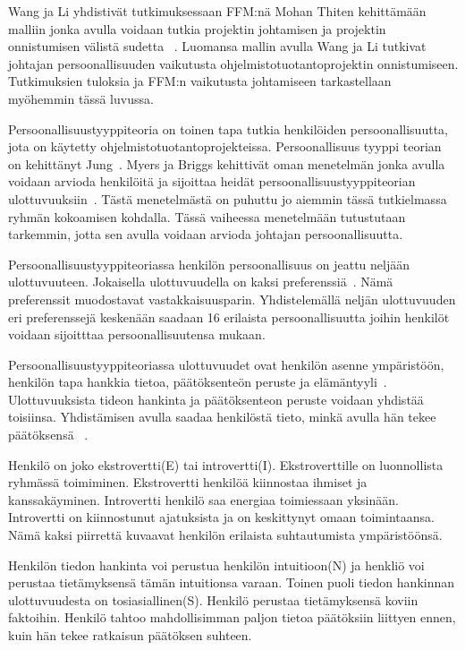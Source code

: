 \documentclass[finnish]{tktltiki2}
\theoremstyle{definition}
\theoremstyle{remark}
\begin{document}
Wang ja Li yhdistivät tutkimuksessaan FFM:nä Mohan Thiten kehittämään malliin jonka avulla voidaan tutkia projektin johtamisen ja projektin onnistumisen välistä sudetta ~\cite{Wang:2009:PMP:1639950.1640049}. Luomansa mallin avulla Wang ja Li tutkivat johtajan persoonallisuuden vaikutusta ohjelmistotuotantoprojektin onnistumiseen. Tutkimuksien tuloksia ja FFM:n vaikutusta johtamiseen tarkastellaan myöhemmin tässä luvussa.

Persoonallisuustyyppiteoria on toinen tapa tutkia henkilöiden persoonallisuutta, jota on käytetty ohjelmistotuotantoprojekteissa. Persoonallisuus tyyppi teorian on kehittänyt Jung~\cite{jung1989psychological}. Myers ja Briggs kehittivät oman menetelmän jonka avulla voidaan arvioda henkilöitä ja sijoittaa heidät persoonallisuustyyppiteorian ulottuvuuksiin~\cite{myers1985manual}. Tästä menetelmästä on puhuttu jo aiemmin tässä tutkielmassa ryhmän kokoamisen kohdalla. Tässä vaiheessa menetelmään tutustutaan tarkemmin, jotta sen avulla voidaan arvioda johtajan persoonallisuutta. 

Persoonallisuustyyppiteoriassa henkilön persoonallisuus on jeattu neljään ulottuvuuteen. Jokaisella ulottuvuudella on kaksi preferenssiä~\cite{bradley1997effect}. Nämä preferenssit muodostavat vastakkaisuusparin. Yhdistelemällä neljän ulottuvuuden eri preferenssejä keskenään saadaan 16 erilaista persoonallisuutta joihin henkilöt voidaan sijoitttaa persoonallisuutensa mukaan.

Persoonallisuustyyppiteoriassa ulottuvuudet ovat henkilön asenne ympäristöön, henkilön tapa hankkia tietoa, päätöksenteön peruste ja elämäntyyli~\cite{bradley1997effect}. Ulottuvuuksista tideon hankinta ja päätöksenteon peruste voidaan yhdistää toisiinsa. Yhdistämisen avulla saadaa henkilöstä tieto, minkä avulla hän tekee päätöksensä ~\cite{bradley1997effect}. 
   
Henkilö on joko ekstrovertti(E) tai introvertti(I). Ekstroverttille on luonnollista ryhmässä toimiminen. Ekstrovertti henkilöä kiinnostaa ihmiset ja kanssakäyminen. Introvertti henkilö saa energiaa toimiessaan yksinään. Introvertti on kiinnostunut ajatuksista ja on keskittynyt omaan toimintaansa. Nämä kaksi piirrettä kuvaavat henkilön erilaista suhtautumista ympäristöönsä.

Henkilön tiedon hankinta voi perustua henkilön intuitioon(N) ja henkliö voi perustaa tietämyksensä tämän intuitionsa varaan. Toinen puoli tiedon hankinnan ulottuvuudesta on tosiasiallinen(S). Henkilö perustaa tietämyksensä koviin faktoihin. Henkilö tahtoo mahdollisimman paljon tietoa päätöksiin liittyen ennen, kuin hän tekee ratkaisun päätöksen suhteen.
\end{document}
